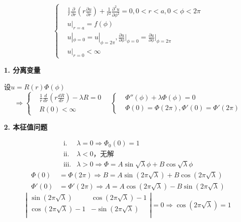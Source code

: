 \begin{ex}[极坐标下的稳态传热问题]
    $$\left\{
        \begin{aligned}
        &
        \frac{1}{r}\frac{\partial}{\partial r}\left(r\frac{\partial u}{\partial r}\right)+\frac{1}{r^2}\frac{\partial^2u}{\partial\phi^2}=0,0<r<a,0<\phi<2\pi\\
        &u|_{r=a}=f(\phi)\\
        &u|_{\phi=0}=u|_{\phi=2\pi},\frac{\partial u}{\partial \phi}\bigg|_{\phi=0}=\frac{\partial u}{\partial \phi}\bigg|_{\phi=2\pi}\\
        &u|_{r=0}<\infty
                \end{aligned}
        \right.$$
    
        \textbf{1. 分离变量}

        设$u=R(r)\Phi(\phi)$
        $$\Rightarrow\left\{
    \begin{aligned}
    &
    \frac{1}{r}\frac{d}{d r}\left(r\frac{dR}{dr}\right)-\lambda R=0\\
    &R(0)<\infty
            \end{aligned}
    \right.
    \quad
    \left\{
    \begin{aligned}
    &
    \Phi''(\phi)+\lambda\Phi(\phi)=0 \\
    &\Phi(0)=\Phi(2\pi),\Phi'(0)=\Phi'(2\pi)
            \end{aligned}
    \right.$$

    \textbf{2. 本征值问题}

    $$\begin{aligned}
        \mathrm{i}. &\lambda=0\Rightarrow \Phi_0(0)=1\\
        \mathrm{ii}. &\lambda<0\mbox{，无解}\\
        \mathrm{iii}. &\lambda>0\Rightarrow\Phi=A\sin\sqrt\lambda\phi+B\cos\sqrt\lambda\phi
    \end{aligned}$$
    $$\begin{aligned}
        \Phi(0)&=\Phi(2\pi)\Rightarrow B=A\sin(2\pi\sqrt\lambda)+B\cos(2\pi\sqrt\lambda)\\
        \Phi'(0)&=\Phi'(2\pi)\Rightarrow A=A\cos(2\pi\sqrt\lambda)-B\sin(2\pi\sqrt\lambda)
    \end{aligned}$$
    $$\left | \begin{matrix}
        \sin(2\pi\sqrt\lambda) &\cos(2\pi\sqrt\lambda)-1\\
        \cos(2\pi\sqrt\lambda)-1 &-\sin(2\pi\sqrt\lambda) \\
        \end{matrix} \right | =0\Rightarrow\cos(2\pi\sqrt\lambda)=1$$


\end{ex}
